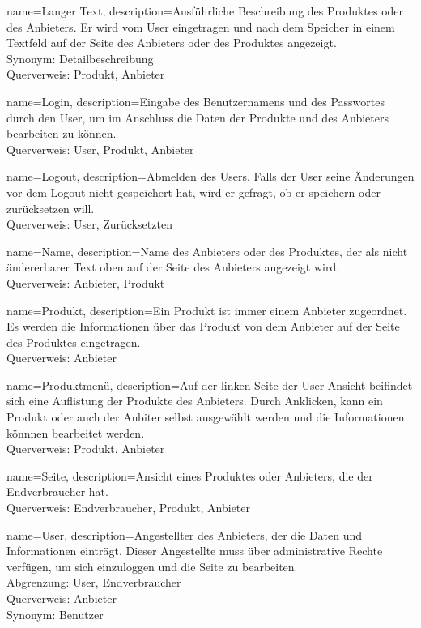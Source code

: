 {
  name=Langer Text,
  description={Ausführliche Beschreibung des Produktes oder des Anbieters. Er wird vom User eingetragen und nach dem Speicher in einem Textfeld auf der Seite des Anbieters oder des Produktes angezeigt. \\ Synonym: Detailbeschreibung \\ Querverweis: Produkt, Anbieter}
}

{
  name=Login,
  description={Eingabe des Benutzernamens und des Passwortes durch den User, um im Anschluss die Daten der Produkte und des Anbieters bearbeiten zu können. \\ Querverweis: User, Produkt, Anbieter}
}

{
  name=Logout,
  description={Abmelden des Users. Falls der User seine Änderungen vor dem Logout nicht gespeichert hat, wird er gefragt, ob er speichern oder zurücksetzen will. \\ Querverweis: User, Zurücksetzten}
}

{
  name=Name,
  description={Name des Anbieters oder des Produktes, der als nicht ändererbarer Text oben auf der Seite des Anbieters angezeigt wird. \\ Querverweis: Anbieter, Produkt}
}

{
  name=Produkt,
  description={Ein Produkt ist immer einem Anbieter zugeordnet. Es werden die Informationen über das Produkt von dem Anbieter auf der Seite des Produktes eingetragen. \\ Querverweis: Anbieter}
}

{
  name=Produktmenü,
  description={Auf der linken Seite der User-Ansicht beifindet sich eine Auflistung der Produkte des Anbieters. Durch Anklicken, kann ein Produkt oder auch der Anbiter selbst ausgewählt werden und die Informationen könnnen bearbeitet werden. \\ Querverweis: Produkt, Anbieter}
}

{
  name=Seite,
  description={Ansicht eines Produktes oder Anbieters, die der Endverbraucher hat. \\ Querverweis: Endverbraucher, Produkt, Anbieter}
}

{
  name=User,
  description={Angestellter des Anbieters, der die Daten und Informationen einträgt. Dieser Angestellte muss über administrative Rechte verfügen, um sich einzuloggen und die Seite zu bearbeiten. \\ Abgrenzung: User, Endverbraucher \\ Querverweis: Anbieter \\ Synonym: Benutzer}
}

